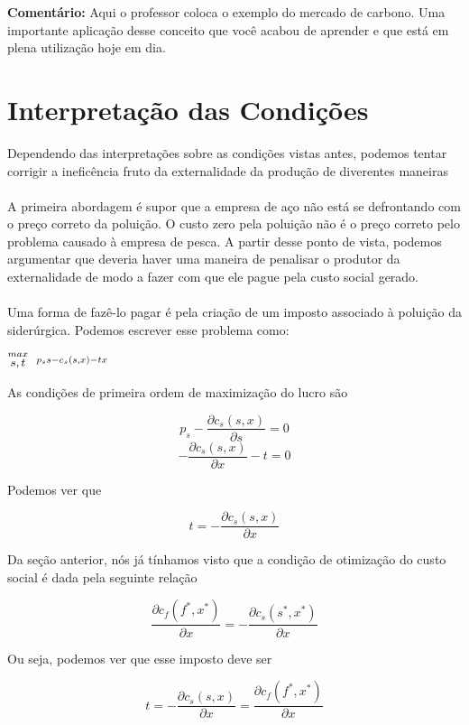 \documentclass[a4paper,11pt,oneside]{book}
\theoremstyle{definition}
\theoremstyle{break}
\begin{document}
\textbf{Comentário: } Aqui o professor coloca o exemplo do mercado de carbono. Uma importante aplicação desse conceito que você acabou de aprender e que está em plena utilização hoje em dia.

\section{Interpretação das Condições}

Dependendo das interpretações sobre as condições vistas antes, podemos tentar corrigir a ineficência fruto da externalidade da produção de diverentes maneiras
\\
\\
A primeira abordagem é supor que a empresa de aço não está se defrontando com o preço correto da poluição. O custo zero pela poluição não é o preço correto pelo problema causado à empresa de pesca. A partir desse ponto de vista, podemos argumentar que deveria haver uma maneira de penalisar o produtor da externalidade de modo a fazer com que ele pague pela custo social gerado.
\\
\\
Uma forma de fazê-lo pagar é pela criação de um imposto associado à poluição da siderúrgica. Podemos escrever esse problema como:

\begin{center}
	\LARGE $ \stackrel{max}{\text{\small $s,t$}} \ \ %
	\stackrel{p_ss - c_s(s,x) - tx}{\ } $ %
\end{center}

As condições de primeira ordem de maximização do lucro são

$$ p_s - \frac{\partial c_s(s,x)}{\partial s} = 0 $$
$$ - \frac{\partial c_s(s,x)}{\partial x} - t = 0 $$

Podemos ver que

$$ t = - \frac{\partial c_s(s,x)}{\partial x} $$

Da seção anterior, nós já tínhamos visto que a condição de otimização do custo social é dada pela seguinte relação 

$$\frac{\partial c_f(f^*,x^*)}{\partial x} = - \frac{\partial c_s(s^*,x^*)}{\partial x} $$

Ou seja, podemos ver que esse imposto deve ser

$$ t = - \frac{\partial c_s(s,x)}{\partial x} = \frac{\partial c_f(f^*,x^*)}{\partial x} $$
\end{document}
